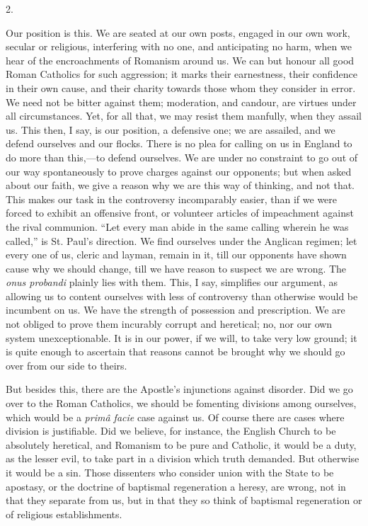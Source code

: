 2.

Our position is this. We are seated at our own
posts, engaged in our own work, secular or religious, interfering with
no one, and anticipating no harm, when we hear of the encroachments of
Romanism around us. We can but honour all good Roman Catholics for
such aggression; it marks their earnestness, their confidence in their
own cause, and their charity towards those whom they consider in
error. We need not be bitter against them; moderation, and candour,
are virtues under all circumstances. Yet, for all that, we may resist
them manfully, when they assail us. This then, I say, is our position,
a defensive one; we are assailed, and we defend ourselves and our
flocks. There is no plea for calling on us in England to do more than
this,—to defend ourselves. We are under no constraint to go out of
our way spontaneously to prove charges against our opponents; but when
asked about our faith, we give a reason why we are this way of
thinking, and not that. This makes our task in the controversy
incomparably easier, than if we were forced to exhibit an offensive
front, or volunteer articles of impeachment against the rival
communion. ``Let every man abide in the same calling wherein he was
called,'' is St. Paul's direction. We find ourselves under the Anglican
regimen; let every one of us, cleric and layman, remain in it, till
our opponents have shown cause why we should change, till we have
reason to suspect we are wrong. The \emph{onus probandi} plainly lies
with them. This, I say, simplifies our argument, as allowing us to
content ourselves with less of controversy than otherwise would be
incumbent on us. We have the strength of possession and prescription.
We are not obliged to prove them incurably corrupt and heretical; no,
nor our own system unexceptionable. It is in our power, if we
will, to take very low ground; it is quite enough to ascertain that
reasons cannot be brought why we should go over from our side to
theirs.

But besides this, there are the Apostle's
injunctions against disorder. Did we go over to the Roman Catholics,
we should be fomenting divisions among ourselves, which would be a \emph{primâ
facie} case against us. Of course there are cases where division is
justifiable. Did we believe, for instance, the English Church to be
absolutely heretical, and Romanism to be pure and Catholic, it would
be a duty, as the lesser evil, to take part in a division which truth
demanded. But otherwise it would be a sin. Those dissenters who
consider union with the State to be apostasy, or the doctrine of
baptismal regeneration a heresy, are wrong, not in that they separate
from us, but in that they so think of baptismal regeneration or of
religious establishments.

